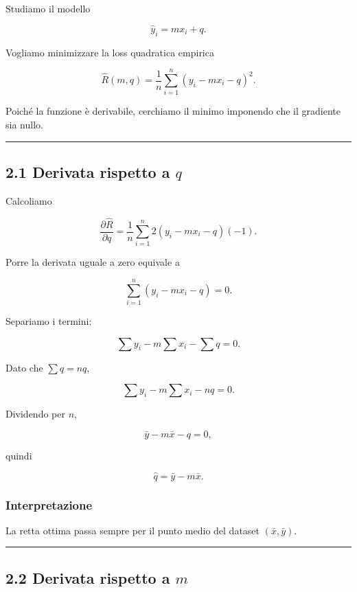 \documentclass{article}
\begin{document}
Studiamo il modello

\[
\hat y_i = mx_i + q.
\]

Vogliamo minimizzare la loss quadratica empirica

\[
\hat R(m,q)=\frac{1}{n}\sum_{i=1}^n (y_i-mx_i-q)^2.
\]

Poiché la funzione è derivabile, cerchiamo il minimo imponendo che il
gradiente sia nullo.

\begin{center}\rule{0.5\linewidth}{0.5pt}\end{center}

\subsection{\texorpdfstring{2.1 Derivata rispetto a
\(q\)}{2.1 Derivata rispetto a q}}\label{derivata-rispetto-a-q}

Calcoliamo

\[
\frac{\partial \hat R}{\partial q}
=
\frac{1}{n}\sum_{i=1}^n 2(y_i-mx_i-q)(-1).
\]

Porre la derivata uguale a zero equivale a

\[
\sum_{i=1}^n (y_i-mx_i-q)=0.
\]

Separiamo i termini:

\[
\sum y_i - m\sum x_i - \sum q = 0.
\]

Dato che \(\sum q = nq\),

\[
\sum y_i - m\sum x_i - nq = 0.
\]

Dividendo per \(n\),

\[
\bar y - m\bar x - q = 0,
\]

quindi

\[
\hat q = \bar y - m\bar x.
\]

\subsubsection{Interpretazione}\label{interpretazione-3}

La retta ottima passa sempre per il punto medio del dataset
\((\bar x,\bar y)\).

\begin{center}\rule{0.5\linewidth}{0.5pt}\end{center}

\subsection{\texorpdfstring{2.2 Derivata rispetto a
\(m\)}{2.2 Derivata rispetto a m}}\label{derivata-rispetto-a-m}
\end{document}
